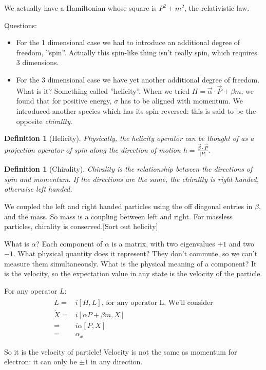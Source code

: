 \documentclass[]{article}
\newtheorem{defn}[thm]{Definition}
\begin{document}
We actually have a Hamiltonian whose square is $P^2+m^2$, the relativistic law.

Questions:
\begin{itemize}
	\item For the 1 dimensional case we had to introduce an additional degree of freedom, ''spin''. Actually this spin-like thing isn't really spin, which requires 3 dimensions.
	\item For the 3 dimensional case we have yet another additional degree of freedom. What is it? Something called ''helicity''. When we tried $H=\vec{\alpha} \cdot \vec{P}+\beta m$, we found that for positive energy, $\sigma$ has to be aligned with momentum. We introduced another species which has its spin reversed: this is said to be the opposite \emph{chirality}.
\end{itemize}

\begin{defn}[Helicity]
	 Physically, the helicity operator can be thought of as a projection operator of spin along the direction of motion $h=\frac{\vec{S}\cdot\vec{P}}{\lvert P \rvert}$.
\end{defn}
\begin{defn}[Chirality]
	Chirality is the relationship between the directions of spin and momentum. If the directions are the same, the chirality is right handed, otherwise left handed.\cite{meredith2018helicity}
\end{defn}

We coupled the left and right handed particles using the off diagonal entries in $\beta$, and the mass. So mass is a coupling between left and right. For massless particles, chirality is conserved.[Sort out helicity]

What is $\alpha$? Each component of $\alpha$ is a matrix, with two eigenvalues $+1$ and two $-1$. What physical quantity does it represent? They don't commute, so we can't measure them simultaneously. What is the physical meaning of a component? It is the velocity, so the expectation value in any state is the velocity of the particle.

For any operator $L$:
\begin{align*}
	\dot L =& i [H,L] \text{, for any operator L. We'll consider}\\
	\dot X =& i[\alpha P + \beta m,X]\\
	=& i \alpha [P,X]\\
	=&\alpha_x
\end{align*}

So it is the velocity of particle! Velocity is not the same as momentum for electron: it can only be $\pm 1$ in any direction.
\end{document}
